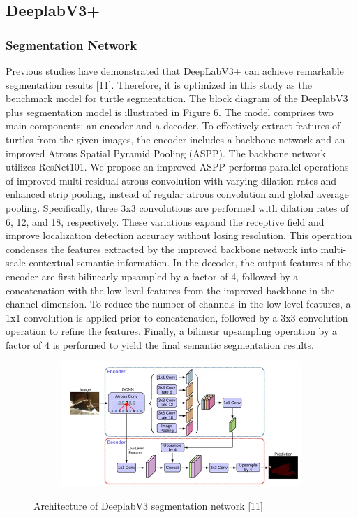 \documentclass[conference]{IEEEtran}
\begin{document}
\subsection{DeeplabV3+}
\subsubsection{Segmentation Network}
Previous studies have demonstrated that DeepLabV3+ can achieve remarkable segmentation results [11]. Therefore, it is optimized in this study as the benchmark model for turtle segmentation. The block diagram of the DeeplabV3 plus segmentation model is illustrated in Figure 6. The model comprises two main components: an encoder and a decoder.
To effectively extract features of turtles from the given images, the encoder includes a backbone network and an improved Atrous Spatial Pyramid Pooling (ASPP). The backbone network utilizes ResNet101. We propose an improved ASPP performs parallel operations of improved multi-residual atrous convolution with varying dilation rates and enhanced strip pooling, instead of regular atrous convolution and global average pooling. Specifically, three 3x3 convolutions are performed with dilation rates of 6, 12, and 18, respectively. These variations expand the receptive field and improve localization detection accuracy without losing resolution. This operation condenses the features extracted by the improved backbone network into multi-scale contextual semantic information. 
In the decoder, the output features of the encoder are first bilinearly upsampled by a factor of 4, followed by a concatenation with the low-level features from the improved backbone in the channel dimension. To reduce the number of channels in the low-level features, a 1x1 convolution is applied prior to concatenation, followed by a 3x3 convolution operation to refine the features. Finally, a bilinear upsampling operation by a factor of 4 is performed to yield the final semantic segmentation results.
\begin{figure}[h]
    \centering
    \begin{subfigure}[t]{0.4\textwidth}
        \centering
        \includegraphics[width=\textwidth]{group/Picture8.png}
    \end{subfigure}%
    \caption{Architecture of DeeplabV3 segmentation network [11]}
\end{figure}
\end{document}
